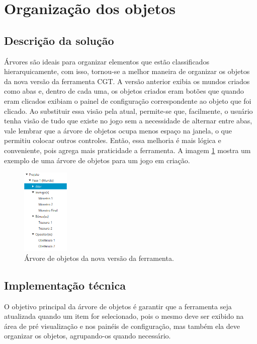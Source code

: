 \documentclass[12pt,oneside,openright,a4paper,english,brazil,sumario=tradicional]{abntex2}
\begin{document}
\section{Organização dos objetos}

\subsection{Descrição da solução}
Árvores são ideais para organizar elementos que estão classificados hierarquicamente, com isso, tornou-se a melhor maneira de organizar os objetos da nova versão da ferramenta CGT.
A versão anterior exibia os mundos criados como abas e, dentro de cada uma, os objetos criados eram botões que quando eram clicados exibiam o painel de configuração correspondente ao objeto que foi clicado.
Ao substituir essa visão pela atual, permite-se que, facilmente, o usuário tenha visão de tudo que existe no jogo sem a necessidade de alternar entre abas, vale lembrar que a árvore de objetos ocupa menos espaço na janela, o que permitiu colocar outros controles.
Então, essa melhoria é mais lógica e conveniente, pois agrega mais praticidade a ferramenta.
A imagem \ref{fig:arvore_objetos} mostra um exemplo de uma árvore de objetos para um jogo em criação.

\begin{figure}[h]
   \centering
   \includegraphics[width=0.2\textwidth]{images/arvore_objetos.png}
   \caption{Árvore de objetos da nova versão da ferramenta.}
   \label{fig:arvore_objetos}
\end{figure}

\subsection{Implementação técnica}
O objetivo principal da árvore de objetos é garantir que a ferramenta seja atualizada quando um item for selecionado, pois o mesmo deve ser exibido na área de pré visualização e nos painéis de configuração, mas também ela deve organizar os objetos, agrupando-os quando necessário.
\end{document}
